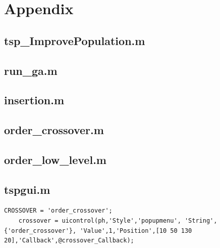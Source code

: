 

\section{Appendix}


\subsection{tsp\_ImprovePopulation.m}

\subsection{run\_ga.m}

\subsection{insertion.m}

\subsection{order\_crossover.m}

\subsection{order\_low\_level.m}

\subsection{tspgui.m}
    \begin{lstlisting}[frame=single]
    CROSSOVER = 'order_crossover';
    crossover = uicontrol(ph,'Style','popupmenu', 'String',{'order_crossover'}, 'Value',1,'Position',[10 50 130 20],'Callback',@crossover_Callback);
    \end{lstlisting}
